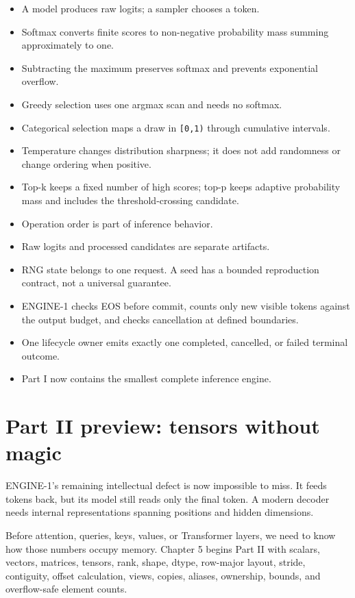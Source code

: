 \begin{itemize}
\tightlist
\item
  A model produces raw logits; a sampler chooses a token.
\item
  Softmax converts finite scores to non-negative probability mass
  summing approximately to one.
\item
  Subtracting the maximum preserves softmax and prevents exponential
  overflow.
\item
  Greedy selection uses one argmax scan and needs no softmax.
\item
  Categorical selection maps a draw in \texttt{{[}0,1)} through
  cumulative intervals.
\item
  Temperature changes distribution sharpness; it does not add randomness
  or change ordering when positive.
\item
  Top-k keeps a fixed number of high scores; top-p keeps adaptive
  probability mass and includes the threshold-crossing candidate.
\item
  Operation order is part of inference behavior.
\item
  Raw logits and processed candidates are separate artifacts.
\item
  RNG state belongs to one request. A seed has a bounded reproduction
  contract, not a universal guarantee.
\item
  ENGINE-1 checks EOS before commit, counts only new visible tokens
  against the output budget, and checks cancellation at defined
  boundaries.
\item
  One lifecycle owner emits exactly one completed, cancelled, or failed
  terminal outcome.
\item
  Part I now contains the smallest complete inference engine.
\end{itemize}

\section{Part II preview: tensors without
magic}\label{part-ii-preview-tensors-without-magic}

ENGINE-1's remaining intellectual defect is now impossible to miss. It
feeds tokens back, but its model still reads only the final token. A
modern decoder needs internal representations spanning positions and
hidden dimensions.

Before attention, queries, keys, values, or Transformer layers, we need
to know how those numbers occupy memory. Chapter 5 begins Part II with
scalars, vectors, matrices, tensors, rank, shape, dtype, row-major
layout, stride, contiguity, offset calculation, views, copies, aliases,
ownership, bounds, and overflow-safe element counts.

